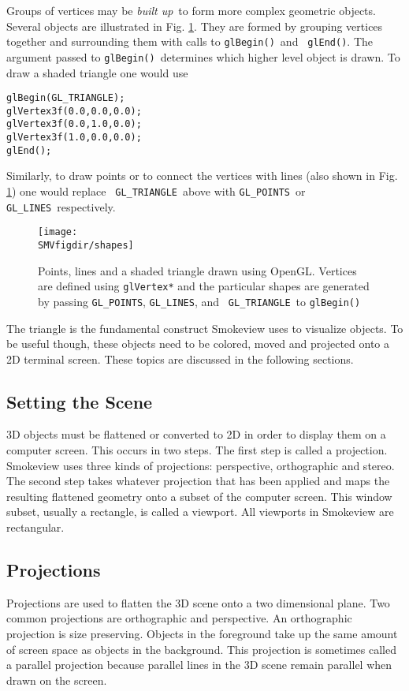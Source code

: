 \documentclass[11pt,twoside]{book}
\begin{document}
Groups of vertices may be {\em built up}\ to form more complex
geometric objects. Several objects are illustrated in Fig.
\ref{figshapes}.  They are formed by grouping vertices together
and surrounding them with calls to {\tt glBegin()}\ and {\tt
glEnd()}. The argument passed to {\tt glBegin()}\ determines which
higher level object is drawn. To draw a shaded triangle one would
use
\begin{lstlisting}
glBegin(GL_TRIANGLE);
glVertex3f(0.0,0.0,0.0);
glVertex3f(0.0,1.0,0.0);
glVertex3f(1.0,0.0,0.0);
glEnd();
\end{lstlisting}
Similarly, to draw points or to connect the vertices with lines
(also shown in Fig. \ref{figshapes}) one would replace {\tt
GL\_TRIANGLE}\ above with {\tt GL\_POINTS}\ or {\tt GL\_LINES}\
respectively.
\begin{figure}[bph]
\begin{center}
\texttt{[image: \\SMVfigdir/shapes]}
\end{center}
\caption[Points, lines and a shaded triangle drawn using OpenGL.]
{Points, lines and a shaded triangle drawn using OpenGL. Vertices
are defined using {\tt glVertex*} and the particular shapes are
generated by passing {\tt GL\_POINTS}, {\tt GL\_LINES}, and {\tt
GL\_TRIANGLE}\ to {\tt glBegin()} } \label{figshapes}
\end{figure}

The triangle is the fundamental construct Smokeview uses to
visualize objects.  To be useful though, these objects need to be
colored, moved and projected onto a 2D terminal screen. These
topics are discussed in the following sections.

%
%

\subsection{Setting the Scene}
3D objects must be flattened or converted to 2D in order to
display them on a computer screen.  This occurs in two steps.  The
first step is called a projection.  Smokeview uses three kinds of
projections: perspective, orthographic and stereo.  The second
step takes whatever projection that has been applied and maps the
resulting flattened geometry onto a subset of the computer screen.
This window subset, usually a rectangle, is called a viewport. All
viewports in Smokeview are rectangular.

\subsection{Projections}
Projections are used to flatten the 3D scene onto a two
dimensional plane. Two common projections are orthographic and
perspective. An orthographic projection is size preserving.
Objects in the foreground take up the same amount of screen space
as objects in the background. This projection is sometimes called
a parallel projection because parallel lines in the 3D scene
remain parallel when drawn on the screen.
\end{document}

